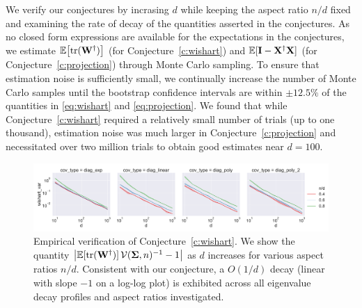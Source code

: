 We verify our conjectures by incrasing $d$ while keeping the aspect ratio
$n/d$ fixed and examining the rate of decay of the quantities asserted
in the conjectures. As no closed form expressions are available for
the expectations in the conjectures, we estimate $\mathbb E\big[\mathrm{tr}(\mathbf W^\dagger)\big]$ (for
Conjecture~\ref{c:wishart}) and $\mathbb E[\mathbf I-\mathbf X^\dagger\mathbf X]$ (for
Conjecture~\ref{c:projection}) through Monte Carlo sampling. To ensure that
estimation noise is sufficiently small, we continually increase the number
of Monte Carlo samples until the bootstrap confidence intervals are
within $\pm 12.5\%$ of the quantities in \eqref{eq:wishart} and
\eqref{eq:projection}. We found that while
Conjecture~\ref{c:wishart} required a relatively small number of
trials (up to one thousand),
estimation noise was much larger in Conjecture~\ref{c:projection} and
necessitated over two million trials to obtain good estimates
near $d=100$.


\begin{figure}[h]
    \includegraphics[width=\textwidth]{continuous_figures/wishart_var.pdf}
  \caption{
    Empirical verification of Conjecture~\ref{c:wishart}. We show
    the quantity $\big|\mathbb E[\mathrm{tr}(\mathbf W^\dagger)]\,\mathcal{V}(\mathbf{\Sigma},n)^{-1} -1\big|$
    as $d$ increases for various aspect ratios $n/d$. Consistent with our conjecture,
    a $O(1/d)$ decay (linear with slope $-1$ on a log-log plot) is
    exhibited across all eigenvalue decay profiles and
    aspect ratios investigated.
  }
  \label{f:conj-wishart}
\end{figure}

